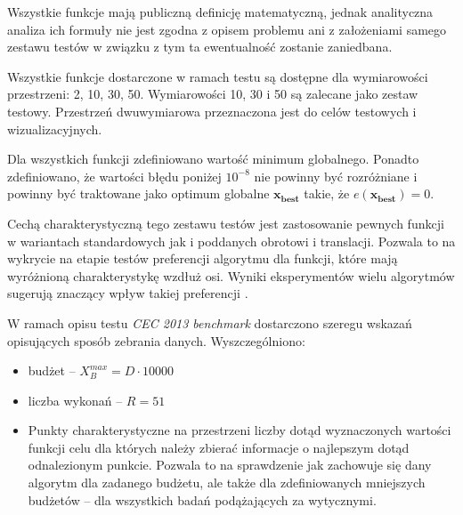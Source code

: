 \documentclass[12pt,a4paper]{report}
\begin{document}
{{{{{{{Wszystkie funkcje mają publiczną definicję matematyczną, jednak analityczna analiza ich formuły nie jest zgodna z opisem problemu ani z założeniami samego zestawu testów w związku z tym ta ewentualność zostanie zaniedbana.
}
\par{
Wszystkie funkcje dostarczone w ramach testu są dostępne dla wymiarowości przestrzeni: 2, 10, 30, 50. Wymiarowości 10, 30 i 50 są zalecane jako zestaw testowy. Przestrzeń dwuwymiarowa przeznaczona jest do celów testowych i wizualizacyjnych.
}
\par{
Dla wszystkich funkcji zdefiniowano wartość minimum globalnego. Ponadto zdefiniowano, że wartości błędu poniżej $10^{-8}$ nie powinny być rozróżniane i powinny być traktowane jako optimum globalne $\mathbf{x_{best}}$ takie, że $e(\mathbf{x_{best}}) = 0$.
}
\par{
Cechą charakterystyczną tego zestawu testów jest zastosowanie pewnych funkcji w wariantach standardowych jak i poddanych obrotowi i translacji. Pozwala to na wykrycie na etapie testów preferencji algorytmu dla funkcji, które mają wyróżnioną charakterystykę wzdłuż osi. Wyniki eksperymentów wielu algorytmów sugerują znaczący wpływ takiej preferencji \cite{JADE,SHADE}.
}
\par{
W ramach opisu testu \emph{CEC 2013 benchmark} dostarczono szeregu wskazań opisujących sposób zebrania danych. Wyszczególniono:
\begin{itemize}
\item budżet -- $X_B^{max} = D \cdot 10 000$
\item liczba wykonań -- $R = 51$
\item Punkty charakterystyczne na przestrzeni liczby dotąd wyznaczonych wartości funkcji celu dla których należy zbierać informacje o najlepszym dotąd odnalezionym punkcie. Pozwala to na sprawdzenie jak zachowuje się dany algorytm dla zadanego budżetu, ale także dla zdefiniowanych mniejszych budżetów -- dla wszystkich badań podążających za wytycznymi.
\end {itemize}
}

}}}}}}
\end{document}
